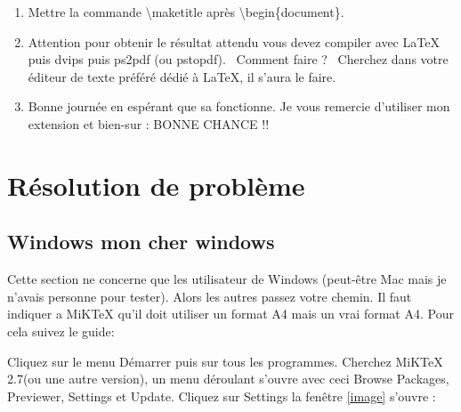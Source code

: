 \documentclass[10pt]{article}
\newcommand{\LOL}[1]{\mbox{\raisebox{1em}{\rotatebox{-90}{:-)}}\raisebox{2em}{\rotatebox{-90}{:-)}}\hspace{-2ex}\rotatebox{-90}{:-)}}~#1~%
\mbox{\raisebox{2em}{\rotatebox{-90}{:-)}}\hspace{-2ex}\rotatebox{-90}{:-)}\raisebox{1em}{\rotatebox{-90}{:-)}}}}
\begin{document}
\begin{enumerate}
 \item  Mettre la commande \mbox{\textbackslash maketitle} apr\`es \mbox{\textbackslash begin\{document\}}.

 \item  Attention pour obtenir le r\'esultat attendu vous devez compiler avec \LaTeX{} puis dvips puis ps2pdf (ou pstopdf).
       \LOL{Comment faire ?} Cherchez dans votre \'editeur de texte pr\'ef\'er\'e d\'edi\'e \`a \LaTeX, il s'aura le faire. 

 \item  Bonne journ\'ee en esp\'erant que sa fonctionne.
   Je vous remercie d'utiliser mon extension et bien-sur :
			BONNE CHANCE !!
\end{enumerate}

\section{R\'esolution de probl\`eme}
\subsection{Windows mon cher windows}

	Cette section ne concerne que les utilisateur de Windows (peut-\^etre Mac mais je n'avais personne pour tester). Alors les autres passez votre chemin.
	Il faut indiquer a MiK\TeX{} qu'il doit utiliser un format A4 mais un vrai format A4.
	Pour cela suivez le guide:

Cliquez sur le menu D\'emarrer puis sur \og tous les programmes\fg{}. Cherchez MiK\TeX{} 2.7(ou une autre version), un menu d\'eroulant s'ouvre avec ceci Browse Packages, 
Previewer, Settings et Update. Cliquez sur \og Settings \fg{} la fen\^etre \ref{image} s'ouvre :
\end{document}
